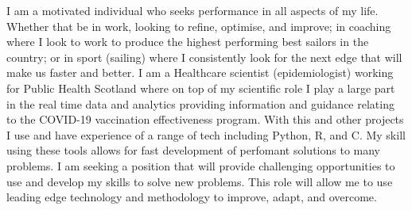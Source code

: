 \newline
\newline
\begin{cvparagraph}
I am a motivated individual who seeks performance in all aspects of my life. Whether that be in work, looking to refine, optimise, and improve; in coaching where I look to work to produce the highest performing best sailors in the country; or in sport (sailing) where I consistently look for the next edge that will make us faster and better.\newline
I am a Healthcare scientist (epidemiologist) working for Public Health Scotland where on top of my scientific role I play a large part in the real time data and analytics providing information and guidance relating to the COVID-19 vaccination effectiveness program.\newline
With this and other projects I use and have experience of a range of tech including Python, R, and C. My skill using these tools allows for fast development of perfomant solutions to many problems.\newline
I am seeking a position that will provide challenging opportunities to use and develop my skills to solve new problems. This role will allow me to use leading edge technology and methodology to improve, adapt, and overcome. 
\end{cvparagraph}
